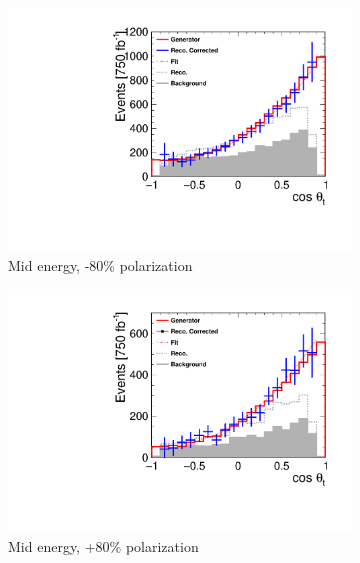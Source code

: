 \begin{figure}[]
\begin{subfigure}[]{0.5\linewidth}
    \includegraphics[width=0.99\linewidth]{TopAnalysis/figures/ThetaPlots_900GeVNeg.pdf} 
    \caption{Mid energy, -80\% polarization} 
    \vspace{4ex}
  \end{subfigure}%
  \begin{subfigure}[]{0.5\linewidth}
    \centering
    \includegraphics[width=0.99\linewidth]{TopAnalysis/figures/ThetaPlots_900GeVPos.pdf} 
    \caption{Mid energy, +80\% polarization} 
    \vspace{4ex}
  \end{subfigure}
  \begin{subfigure}[]{0.5\linewidth}
    \centering

\end{subfigure}
\end{figure}
